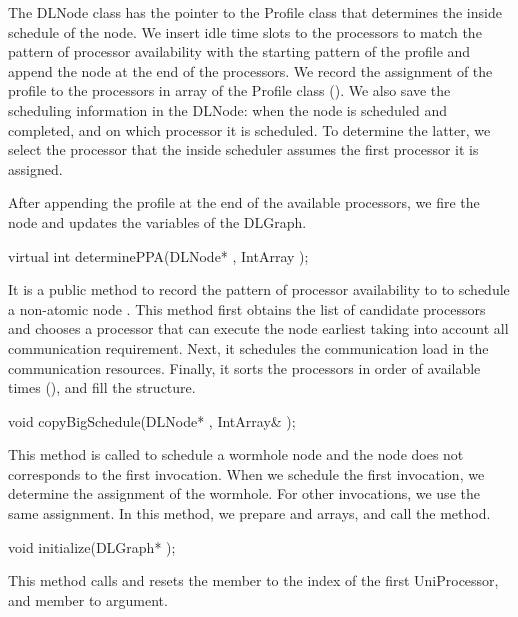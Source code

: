 The DLNode class has the pointer to the Profile class that determines the
inside schedule of the node. We insert idle time slots to the
processors to match the pattern of processor availability with the starting
pattern of the profile and append the node at the end of the processors. 
We record the assignment of the profile to
the processors in  array of the Profile class
(). We also save the scheduling information in the
DLNode: when the node is scheduled and completed, and on which processor
it is scheduled. To determine the latter, we select the processor that
the inside scheduler assumes the first processor it is assigned.

After appending the profile at the end of the available processors, we
fire the node and updates the variables of the DLGraph.

\begin{example}
virtual int determinePPA(DLNode* , IntArray );
\end{example}

It is a public method to record the pattern of processor availability to
 to schedule a non-atomic node .
This method first obtains the list of candidate processors and chooses
a processor that can execute the node earliest taking into account
all communication requirement. Next, it schedules the communication 
load in the communication resources. Finally, it sorts the processors
in order of available times (), and
fill the  structure.

\begin{example}
void copyBigSchedule(DLNode* , IntArray& );
\end{example}

This method is called to schedule a wormhole node and the node does not
corresponds to the first invocation. When we schedule the first invocation,
we determine the assignment of the wormhole. For other invocations,
we use the same assignment. In this method, we prepare  and
 arrays, and call the  method.

\begin{example}
void initialize(DLGraph* );
\end{example}

This method calls  and resets the
 member to the index of the first UniProcessor, and
 member to  argument.

